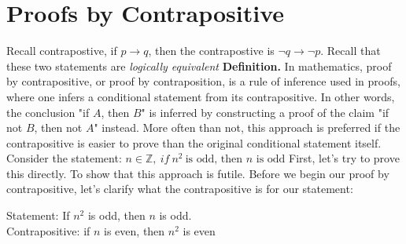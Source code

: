 \documentclass{report}
\begin{document}
    \section{\LARGE Proofs by Contrapositive}
    \bigbreak \noindent 
    Recall contrapostive, if $p \rightarrow q $, then the contrapostive is $\neg q \rightarrow \neg p$. Recall that these two statements are \textit{logically equivalent}
    \bigbreak \noindent 
    \textbf{Definition.} In mathematics, proof by contrapositive, or proof by contraposition, is a rule of inference used in proofs, where one infers a conditional statement from its contrapositive. In other words, the conclusion "if $A$, then $B$" is inferred by constructing a proof of the claim "if not $B$, then not $A$" instead. More often than not, this approach is preferred if the contrapositive is easier to prove than the original conditional statement itself.
    \bigbreak \noindent 
    Consider the statement: \textit{$n \in \mathbb{Z},\ if\ n^{2}\ \text{is odd, then $n$ is odd}$}
    \bigbreak \noindent 
    First, let's try to prove this directly. To show that this approach is futile.
    \bigbreak \noindent 
    \bigbreak \noindent 
    Before we begin our proof by contrapositive, let's clarify what the contrapositive is for our statement: 
    \begin{center}
        Statement: If $n^{2}$ is odd, then $n$ is odd. \\
        Contrapositive: if $n$ is even, then $n^{2}$ is even
    \end{center}
    \bigbreak \noindent 
\end{document}

